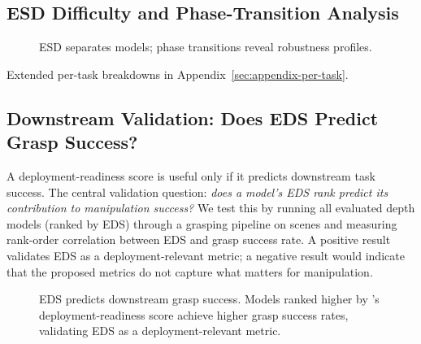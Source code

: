 

\subsection{ESD Difficulty and Phase-Transition Analysis}

\begin{figure}[t]
    \centering
    \caption{ESD separates models; phase transitions reveal robustness profiles.}
    \label{fig:esd-phase}
\end{figure}

Extended per-task breakdowns in Appendix~\ref{sec:appendix-per-task}.


\subsection{Downstream Validation: Does EDS Predict Grasp Success?}
\label{sec:downstream}

A deployment-readiness score is useful only if it predicts downstream task success.
The central validation question: \textit{does a model's EDS rank predict its contribution to manipulation success?}
We test this by running all  evaluated depth models (ranked by EDS) through a grasping pipeline on \coolname{} scenes and measuring rank-order correlation between EDS and grasp success rate.
A positive result validates EDS as a deployment-relevant metric; a negative result would indicate that the proposed metrics do not capture what matters for manipulation.

\begin{figure}[t]
    \centering
    \caption{EDS predicts downstream grasp success. Models ranked higher by \coolname{}'s deployment-readiness score achieve higher grasp success rates, validating EDS as a deployment-relevant metric.}
    \label{fig:downstream}
\end{figure}

